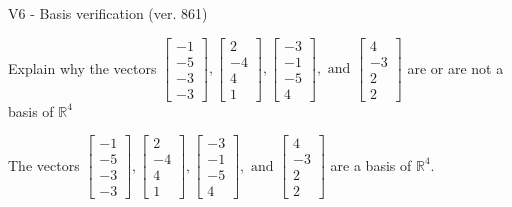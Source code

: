 \begin{exercise}
  \begin{exerciseTitle}V6 - Basis verification (ver. 861)\end{exerciseTitle}
  \begin{exerciseStatement}
    Explain why the vectors \(\left[\begin{array}{r}
-1 \\
-5 \\
-3 \\
-3
\end{array}\right] , \left[\begin{array}{r}
2 \\
-4 \\
4 \\
1
\end{array}\right] , \left[\begin{array}{r}
-3 \\
-1 \\
-5 \\
4
\end{array}\right] , \text{ and } \left[\begin{array}{r}
4 \\
-3 \\
2 \\
2
\end{array}\right]\) are or are not a basis of \(\mathbb{R}^4\)	


  \end{exerciseStatement}
  \begin{exerciseAnswer}
   The vectors \(\left[\begin{array}{r}
-1 \\
-5 \\
-3 \\
-3
\end{array}\right] , \left[\begin{array}{r}
2 \\
-4 \\
4 \\
1
\end{array}\right] , \left[\begin{array}{r}
-3 \\
-1 \\
-5 \\
4
\end{array}\right] , \text{ and } \left[\begin{array}{r}
4 \\
-3 \\
2 \\
2
\end{array}\right]\) 
  	 are  a basis of \(\mathbb{R}^4\).
  


  \end{exerciseAnswer}
\end{exercise}